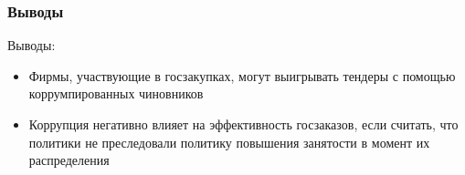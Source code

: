 \begin{frame}
\frametitle{Выводы}

Выводы:
\begin{itemize}
	
	\item Фирмы, участвующие в госзакупках, могут выигрывать тендеры с помощью коррумпированных чиновников
	
	\item Коррупция негативно влияет на эффективность госзаказов, если считать, что политики не преследовали политику повышения занятости в момент их распределения
	
\end{itemize}

\end{frame}